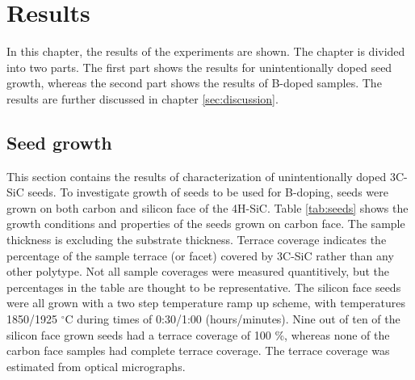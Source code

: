 

	
	

	
	

\chapter{Results}
\label{sec:results}
In this chapter, the results of the experiments are shown. The chapter is divided into two parts. The first part shows the results for unintentionally doped seed growth, whereas the second part shows the results of B-doped samples. The results are further discussed in chapter \ref{sec:discussion}. 

\section{Seed growth}
\label{sec:results:seeds}
This section contains the results of characterization of unintentionally doped 3C-SiC seeds. To investigate growth of seeds to be used for B-doping, seeds were grown on both carbon and silicon face of the 4H-SiC. Table \ref{tab:seeds} shows the growth conditions and properties of the seeds grown on carbon face. The sample thickness is excluding the substrate thickness. Terrace coverage indicates the percentage of the sample terrace (or facet) covered by 3C-SiC rather than any other polytype. Not all sample coverages were measured quantitively, but the percentages in the table are thought to be representative. The silicon face seeds were all grown with a two step temperature ramp up scheme, with temperatures 1850/1925 $^\circ$C during times of 0:30/1:00 (hours/minutes). Nine out of ten of the silicon face grown seeds had a terrace coverage of 100 \%, whereas none of the carbon face samples had complete terrace coverage. The terrace coverage was estimated from optical micrographs.

